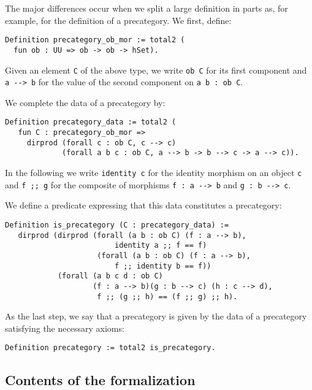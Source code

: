 The major differences occur when we split a large definition in parts as, for example, for the definition of a precategory. 
We first, define:


\begin{lstlisting}
Definition precategory_ob_mor := total2 (
  fun ob : UU => ob -> ob -> hSet).
\end{lstlisting}
%
Given an element \lstinline!C! of the above type, we write \lstinline!ob C!
for its first component and \lstinline!a --> b! for the value of the second 
component on \lstinline!a b : ob C!.

We complete the data of a precategory by:

\begin{lstlisting}
Definition precategory_data := total2 (
   fun C : precategory_ob_mor =>
     dirprod (forall c : ob C, c --> c)
             (forall a b c : ob C, a --> b -> b --> c -> a --> c)).
\end{lstlisting}
In the following we write \lstinline!identity c! for the identity morphism
on an object \lstinline!c! and \lstinline!f ;; g! for the composite of 
morphisms \lstinline!f : a --> b! and \lstinline!g : b --> c!.

We define a predicate expressing that this data constitutes a precategory:
\begin{lstlisting}
Definition is_precategory (C : precategory_data) :=
   dirprod (dirprod (forall (a b : ob C) (f : a --> b),
                         identity a ;; f == f)
                     (forall (a b : ob C) (f : a --> b),
                         f ;; identity b == f))
            (forall (a b c d : ob C)
                    (f : a --> b)(g : b --> c) (h : c --> d),
                     f ;; (g ;; h) == (f ;; g) ;; h).
\end{lstlisting}
As the last step, we say that a precategory is given by the data of a precategory
satisfying the necessary axioms:
\begin{lstlisting}
Definition precategory := total2 is_precategory.
\end{lstlisting}







\subsection*{Contents of the formalization}


